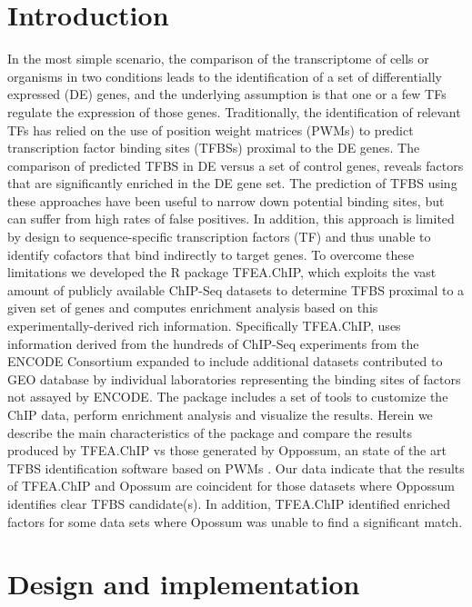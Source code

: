 \documentclass[10pt,letterpaper]{article}
\begin{document}
\section*{Introduction}
In the most simple scenario, the comparison of the transcriptome of cells or organisms in two conditions leads to the identification of a set of differentially expressed (DE) genes, and the underlying assumption is that one or a few TFs regulate the expression of those genes. Traditionally, the identification of relevant TFs has relied on the use of position weight matrices (PWMs) to predict transcription factor binding sites (TFBSs) proximal to the DE genes\cite{Wasserman}. The comparison of predicted TFBS in DE versus a set of control genes, reveals factors that are significantly enriched in the DE gene set. The prediction of TFBS using these approaches have been useful to narrow down potential binding sites, but can suffer from high rates of false positives. In addition, this approach is limited by design to sequence-specific transcription factors (TF) and thus unable to identify cofactors that bind indirectly to target genes. To overcome these limitations we developed the R package TFEA.ChIP, which exploits the vast amount of publicly available ChIP-Seq datasets to determine TFBS proximal to a given set of genes and computes enrichment analysis based on this experimentally-derived rich information. Specifically TFEA.ChIP, uses information derived from the hundreds of ChIP-Seq experiments from the ENCODE Consortium\cite{ENCODE} expanded to include additional datasets contributed to GEO database\cite{GEO1}\cite{GEO2} by individual laboratories representing the binding sites of factors not assayed by ENCODE. The package includes a set of tools to customize the ChIP data, perform enrichment analysis and visualize the results. Herein we describe the main characteristics of the package and compare the results produced by TFEA.ChIP vs those generated by Oppossum, an state of the art TFBS identification software based on PWMs \cite{Kwon2012}. Our data indicate that the results of TFEA.ChIP and Opossum are coincident for those datasets where Oppossum identifies clear TFBS candidate(s). In addition, TFEA.ChIP identified enriched factors for some data sets where Opossum was unable to find a significant match.

\section*{Design and implementation}
\end{document}

